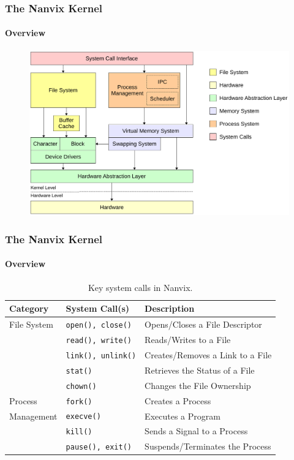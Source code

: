 \documentclass{beamer}
\begin{document}
		\begin{frame}
		\frametitle{The Nanvix Kernel}
		\framesubtitle{Overview}
			\begin{figure}
				\centering
				\includegraphics[width=\linewidth]{nanvix-architecture}
			\end{figure}
		\end{frame}

		\begin{frame}
		\frametitle{The Nanvix Kernel}
		\framesubtitle{Overview}
			\begin{table}
				\small
				\caption{Key system calls in Nanvix.}
				\begin{tabular}{l l l}
					\toprule
					\textbf{Category}  & \textbf{System Call(s)}   & \textbf{Description}             \\
					\midrule
					File System        & \texttt{open(), close()}  & Opens/Closes a File Descriptor   \\
					                   & \texttt{read(), write()}  & Reads/Writes to a File           \\
					                   & \texttt{link(), unlink()} & Creates/Removes a Link to a File \\ 
					                   & \texttt{stat()}           & Retrieves the Status of a File   \\
					                   & \texttt{chown()}          & Changes the File Ownership       \\[0.5em] 
					Process            & \texttt{fork()}           & Creates a Process                \\
					Management         & \texttt{execve()}         & Executes a Program               \\ 
					                   & \texttt{kill()}           & Sends a Signal to a Process      \\ 
					                   & \texttt{pause(), exit()}  & Suspends/Terminates the Process  \\ 
					\bottomrule
				\end{tabular}
			\end{table}
		\end{frame}
\end{document}
